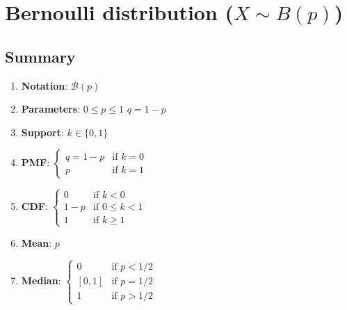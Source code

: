 \section{Bernoulli distribution ($X \sim B(p)$)}

\subsection{Summary}

\begin{enumerate}
    \item \textbf{Notation}: 
    $
        \mathcal{B}(p)
    $
    \hfill \cite{wiki/Bernoulli_distribution}

    \item \textbf{Parameters}:
    $  {\displaystyle 0\leq p\leq 1}$  
    \hspace{1cm}
    $ {\displaystyle q=1-p} $ 
    \hfill \cite{wiki/Bernoulli_distribution}

    \item \textbf{Support}: 
    $
         {\displaystyle k\in \{0,1\}}
    $
    \hfill \cite{wiki/Bernoulli_distribution}

    \item \textbf{PMF}:
    $ 
         {\displaystyle {\begin{cases}q=1-p&{\text{if }}k=0\\p&{\text{if }}k=1\end{cases}}}
    $
    \hfill \cite{wiki/Bernoulli_distribution}

    \item \textbf{CDF}:
    $
         {\displaystyle {\begin{cases}0&{\text{if }}k<0\\1-p&{\text{if }}0\leq k<1\\1&{\text{if }}k\geq 1\end{cases}}}
    $
    \hfill \cite{wiki/Bernoulli_distribution}

    \item \textbf{Mean}: 
    $ 
        p
    $
    \hfill \cite{wiki/Bernoulli_distribution}

    \item \textbf{Median}: 
    $ 
         {\displaystyle {\begin{cases}0&{\text{if }}p<1/2\\\left[0,1\right]&{\text{if }}p=1/2\\1&{\text{if }}p>1/2\end{cases}}}
    $
    \hfill \cite{wiki/Bernoulli_distribution}


\end{enumerate}
